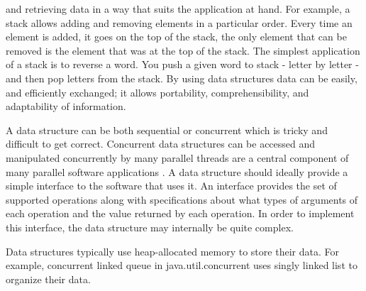 and retrieving data in a way that suits the application at hand. For example, a stack allows adding and removing elements in a particular order. Every time an element is added, it goes on the top of the stack, the only element that can be removed is the element that was at the top of the stack. The simplest application of a stack is to reverse a word. You push a given word to stack - letter by letter - and then pop letters from the stack.
By using data structures data can be easily, and efficiently exchanged; it allows portability, comprehensibility, and adaptability of information.

A data structure can be both sequential or concurrent which is tricky and difficult to get correct. Concurrent data structures can be accessed and manipulated concurrently by many parallel threads are a central component of many parallel software applications . A data structure should ideally provide a simple interface to the software that uses it. An interface provides the set of supported operations along with specifications about what types of arguments of each operation and the value returned by each operation. In order to implement this interface, the data structure may internally be quite complex.

Data structures typically use heap-allocated memory to store their data. For example, concurrent linked queue in java.util.concurrent uses singly linked list to organize their data. %




